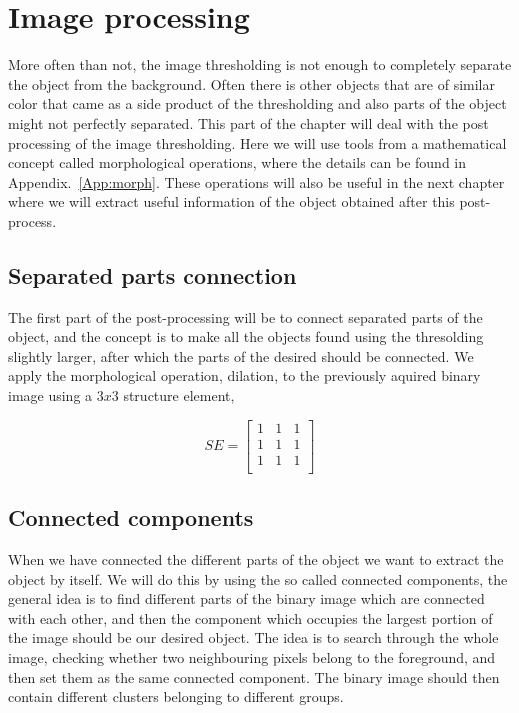\section{Image processing}

More often than not, the image thresholding is not enough to completely separate the object from the background. Often there is other objects that are of similar color that came as a side product of the thresholding and also parts of the object might not perfectly separated. This part of the chapter will deal with the post processing of the image thresholding. Here we will use tools from a mathematical concept called morphological operations, where the details can be found in Appendix.~\ref{App:morph}. These operations will also be useful in the next chapter where we will extract useful information of the object obtained after this post-process.

\subsection{Separated parts connection}

The first part of the post-processing will be to connect separated parts of the object, and the concept is to make all the objects found using the thresolding slightly larger, after which the parts of the desired should be connected. We apply the morphological operation, dilation, to the previously aquired binary image using a $3x3$ structure element,

\begin{equation}
    SE=\left[
        \begin{array}{ccc}
        1 & 1 & 1 \\
        1 & 1 & 1 \\
        1 & 1 & 1 \\
        \end{array}
    \right]
    \label{eq:se}
\end{equation}



\subsection{Connected components}

When we have connected the different parts of the object we want to extract the object by itself. We will do this by using the so called connected components, the general idea is to find different parts of the binary image which are connected with each other, and then the component which occupies the largest portion of the image should be our desired object. The idea is to search through the whole image, checking whether two neighbouring pixels belong to the foreground, and then set them as the same connected component. The binary image should then contain different clusters belonging to different groups.

